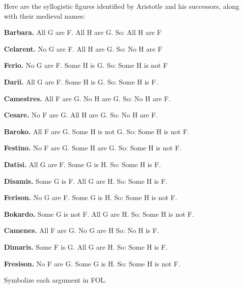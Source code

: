 

\practiceproblems
\problempart
\label{pr.BarbaraEtc}
Here are the syllogistic figures identified by Aristotle and his successors, along with their medieval names:
\begin{ebullet}
	\item \textbf{Barbara.} All G are F. All H are G. So:  All H are F
	\item \textbf{Celarent.} No G are F. All H are G. So: No H are F
	\item \textbf{Ferio.} No G are F. Some H is G. So: Some H is not F
	\item \textbf{Darii.} All G are F. Some H is G. So: Some H is F.
	\item \textbf{Camestres.} All F are G. No H are G. So: No H are F.
	\item \textbf{Cesare.} No F are G. All H are G. So: No H are F.
	\item \textbf{Baroko.} All F are G. Some H is not G. So: Some H is not F.
	\item \textbf{Festino.} No F are G. Some H are G. So: Some H is not F.
	\item \textbf{Datisi.} All G are F. Some G is H. So: Some H is F.
	\item \textbf{Disamis.} Some G is F. All G are H. So: Some H is F.
	\item \textbf{Ferison.} No G are F. Some G is H. So: Some H is not F.
	\item \textbf{Bokardo.} Some G is not F. All G are H. So:  Some H is not F.
	\item \textbf{Camenes.} All F are G. No G are H So: No H is F.
	\item \textbf{Dimaris.} Some F is G. All G are H. So: Some H is F.
	\item \textbf{Fresison.} No F are G. Some G is H. So: Some H is not F.
\end{ebullet}
Symbolize each argument in FOL.

\

